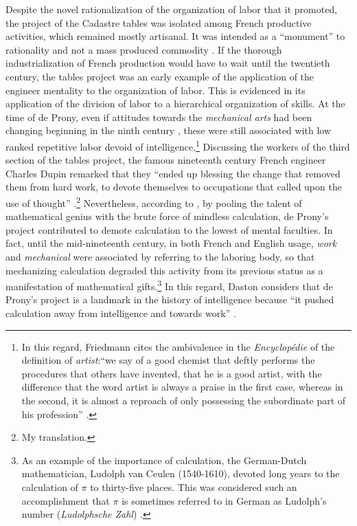 \documentclass[version=last,draft=false,paper=A4,portrait,twoside=true,twocolumn=false,headinclude=false,footinclude=false,mpinclude=true,fontsize=12,BCOR=20mm,DIV=calc,pagesize=auto,open=right,chapterprefix=true,numbers=autoendperiod,headsepline=false,headings=twolinechapter,parskip=false]{scrbook}
\begin{document}
Despite the novel rationalization of the organization of labor that it
promoted, the project of the Cadastre tables was isolated among French
productive activities, which remained mostly artisanal. It was intended as
a ``monument'' to rationality and not a mass produced commodity
\autocite[p. 57]{prony1804}. If the thorough industrialization of French
production would have to wait until the twentieth century, the tables
project was an early example of the application of the engineer mentality
to the organization of labor. This is evidenced in its application of the
division of labor to a hierarchical organization of skills. At the time of
de Prony, even if attitudes towards the \emph{mechanical arts} had been changing
beginning in the ninth century \autocite[p. 10]{vatin_pillon2003_2007},
these were still associated with low ranked repetitive labor devoid of
intelligence.\footnote{In this regard, Friedmann cites the ambivalence in the \emph{Encyclopédie}
of the definition of \emph{artist}:``we say of a good chemist that deftly
performs the procedures that others have invented, that he is a good
artist, with the difference that the word artist is always a praise in the
first case, whereas in the second, it is almost a reproach of only
possessing the subordinate part of his profession''
\autocite[my translation, footnote 1, p. 55]{friedmann1953}.} Discussing the workers of the third section of the
tables project, the famous nineteenth century French engineer Charles Dupin
remarked that they ``ended up blessing the change that removed them from
hard work, to devote themselves to occupations that called upon the use of
thought'' \autocite[p. 211]{dupin1824}.\footnote{My translation.} Nevertheless, according to
\textcite{daston1994}, by pooling the talent of mathematical genius with the
brute force of mindless calculation, de Prony's project contributed to
demote calculation to the lowest of mental faculties. In fact, until the
mid-nineteenth century, in both French and English usage, \emph{work} and
\emph{mechanical} were associated by referring to the laboring body, so that
mechanizing calculation degraded this activity from its previous status as
a manifestation of mathematical gifts.\footnote{As an example of the importance of calculation, the German-Dutch
mathematician, Ludolph van Ceulen (1540-1610), devoted long years to the
calculation of \(\pi\) to thirty-five places. This was considered such an
accomplishment that \(\pi\) is sometimes referred to in German as Ludolph's
number (\emph{Ludolphsche Zahl}) \autocite[p. 50]{maor1994}.} In this regard, Daston
considers that de Prony's project is a landmark in the history of
intelligence because ``it pushed calculation away from intelligence and
towards work'' \autocite[p. 190]{daston1994}.
\end{document}
